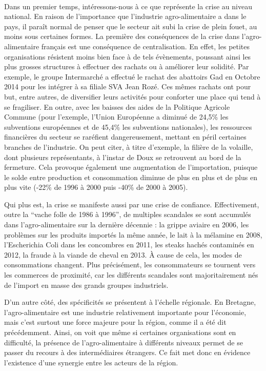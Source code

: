 \documentclass[a4paper,10pt]{report}
\begin{document}
			\paragraph{}Dans un premier temps, intéressons-nous à ce que représente la crise au niveau national. En raison de l'importance que l'industrie agro-alimentaire a dans le pays, il paraît normal de penser que le secteur ait subi la crise de plein fouet, au moins sous certaines formes. La première des conséquences de la crise dans l'agro-alimentaire français est une conséquence de centralisation. En effet, les petites organisations résistent moins bien face à de tels évènements, poussant ainsi les plus grosses structures à effectuer des rachats ou à améliorer leur solidité. Par exemple, le groupe Intermarché a effectué le rachat des abattoirs Gad en Octobre 2014 pour les intégrer à sa filiale SVA Jean Rozé. Ces mêmes rachats ont pour but, entre autres, de diversifier leurs activités pour conforter une place qui tend à se fragiliser. En outre, avec les baisses des aides de la Politique Agricole Commune (pour l’exemple, l’Union Européenne a diminué de 24,5\% les subventions européennes et de 45,4\% les subventions nationales), les ressources financières du secteur se raréfient dangereusement, mettant en péril certaines branches de l’industrie. On peut citer, à titre d’exemple, la filière de la volaille, dont plusieurs représentants, à l’instar de Doux se retrouvent au bord de la fermeture. Cela provoque également une augmentation de l’importation, puisque le solde entre production et consommation diminue de plus en plus et de plus en plus vite (-22\% de 1996 à 2000 puis -40\% de 2000 à 2005)\cite{AvenirExploitationVolailleBretonne}.

			Qui plus est, la crise se manifeste aussi par une crise de confiance. Effectivement, outre la “vache folle de 1986 à 1996”, de multiples scandales se sont accumulés dans l’agro-alimentaire sur la dernière décennie\cite{Scandales} : la grippe aviaire en 2006, les problèmes sur les produits importés la même année, le lait à la mélamine en 2008, l’Escherichia Coli dans les concombres en 2011, les steaks hachés contaminés en 2012, la fraude à la viande de cheval en 2013. À cause de cela, les modes de consommations changent. Plus précisément, les consommateurs se tournent vers les commerces de proximité, car les différents scandales sont majoritairement nés de l’import en masse des grands groupes industriels.
			
			D’un autre côté, des spécificités se présentent à l’échelle régionale. En Bretagne, l’agro-alimentaire est une industrie relativement importante pour l’économie, mais c’est surtout une force majeure pour la région, comme il a été dit précédemment. Ainsi, on voit que même si certaines organisations sont en difficulté, la présence de l’agro-alimentaire à différents niveaux permet de se passer du recours à des intermédiaires étrangers. Ce fait met donc en évidence l’existence d’une synergie entre les acteurs de la région.
\end{document}
